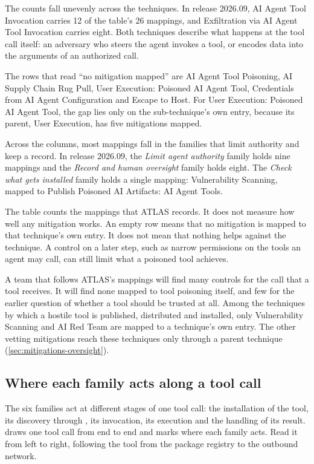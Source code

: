 The counts fall unevenly across the techniques. In release 2026.09, AI Agent Tool Invocation
carries 12 of the table's 26 mappings, and Exfiltration via AI Agent Tool Invocation carries eight.
Both techniques describe what happens at the tool call itself: an adversary who steers the agent
invokes a tool, or encodes data into the arguments of an authorized call.

The rows that read ``no mitigation mapped'' are AI Agent Tool Poisoning, AI Supply Chain Rug Pull,
User Execution: Poisoned AI Agent Tool, Credentials from AI Agent Configuration and Escape to Host.
For User Execution: Poisoned AI Agent Tool, the gap lies only on the sub-technique's own entry,
because its parent, User Execution, has five mitigations mapped.

Across the columns, most mappings fall in the families that limit authority and keep a record. In
release 2026.09, the \emph{Limit agent authority} family holds nine mappings and the \emph{Record
and human oversight} family holds eight. The \emph{Check what gets installed} family holds a single
mapping: Vulnerability Scanning, mapped to Publish Poisoned AI Artifacts: AI Agent Tools.

The table counts the mappings that ATLAS records. It does not measure how well any mitigation
works. An empty row means that no mitigation is mapped to that technique's own entry. It does not
mean that nothing helps against the technique. A control on a later step, such as narrow
permissions on the tools an agent may call, can still limit what a poisoned tool achieves.

A team that follows ATLAS's mappings will find many controls for the call that a tool receives. It
will find none mapped to tool poisoning itself, and few for the earlier question of whether a tool
should be trusted at all. Among the techniques by which a hostile tool is published, distributed and
installed, only Vulnerability Scanning and AI Red Team are mapped to a technique's own entry. The
other vetting mitigations reach these techniques only through a parent technique
(\cref{sec:mitigations-oversight}).

\subsection{Where each family acts along a tool call}
\label{sec:mitigations-placement}

The six families act at different stages of one tool call: the installation of the tool, its
discovery through , its invocation, its execution and the handling of its
result.  draws one tool call from end to end and marks where each
family acts. Read it from left to right, following the tool from the package registry to the
outbound network.

